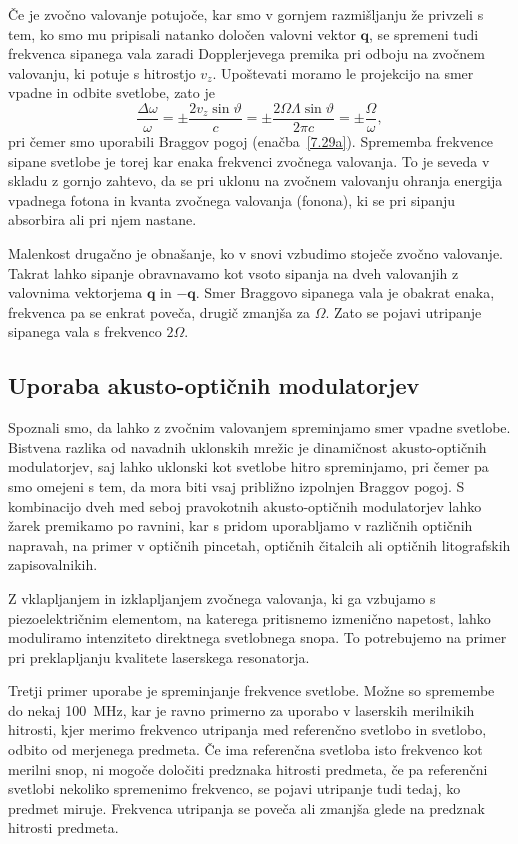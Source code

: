 Če je zvočno valovanje potujoče, kar smo v gornjem razmišljanju že privzeli
s tem, ko smo mu pripisali natanko določen valovni vektor $\mathbf{q}$,
se spremeni tudi frekvenca sipanega vala zaradi Dopplerjevega premika
pri odboju na zvočnem valovanju, ki potuje s hitrostjo $v_{z}$. Upoštevati
moramo le projekcijo na smer vpadne in odbite svetlobe, zato je 
\begin{equation}
\frac{\Delta\omega}{\omega}=\pm\frac{2v_{z}\sin\vartheta}{c}=
\pm\frac{2\Omega\Lambda\sin\vartheta}{2 \pi c}=\pm\frac{\Omega}{\omega},
\label{7.32}
\end{equation}
pri čemer smo uporabili Braggov pogoj (enačba~\ref{7.29a}). Sprememba frekvence
sipane svetlobe je torej kar enaka frekvenci zvočnega valovanja. To je seveda v skladu 
z gornjo zahtevo, da se pri uklonu na zvočnem valovanju ohranja energija
vpadnega fotona in kvanta zvočnega valovanja (fonona), ki se pri sipanju 
absorbira ali pri njem nastane.

Malenkost drugačno je obnašanje, ko v snovi vzbudimo stoječe zvočno valovanje. 
Takrat lahko sipanje obravnavamo kot vsoto sipanja na dveh valovanjih z valovnima 
vektorjema $\mathbf{q}$ in $-\mathbf{q}$. Smer Braggovo sipanega vala je obakrat enaka, 
frekvenca pa se enkrat poveča, drugič zmanjša za $\Omega$. Zato se pojavi utripanje
sipanega vala s frekvenco $2\Omega$.

\subsection*{Uporaba akusto-optičnih modulatorjev}
Spoznali smo, da lahko z zvočnim valovanjem spreminjamo smer vpadne svetlobe.
Bistvena razlika od navadnih uklonskih mrežic je dinamičnost akusto-optičnih modulatorjev, 
saj lahko uklonski kot svetlobe hitro spreminjamo, pri čemer pa smo omejeni s 
tem, da mora biti vsaj približno izpolnjen Braggov pogoj. S kombinacijo dveh med seboj 
pravokotnih akusto-optičnih modulatorjev lahko žarek 
premikamo po ravnini, kar s pridom uporabljamo v različnih optičnih napravah, 
na primer v optičnih pincetah, optičnih čitalcih ali 
optičnih litografskih zapisovalnikih.

Z vklapljanjem in izklapljanjem zvočnega valovanja, ki ga vzbujamo s piezoelektričnim elementom,
na katerega pritisnemo izmenično napetost, lahko moduliramo intenziteto
direktnega svetlobnega snopa. To potrebujemo na primer pri preklapljanju
kvalitete laserskega resonatorja.

Tretji primer uporabe je spreminjanje frekvence svetlobe. Možne so spremembe
do nekaj 100~MHz, kar je ravno primerno za uporabo v laserskih merilnikih
hitrosti, kjer merimo frekvenco utripanja med referenčno svetlobo in svetlobo, odbito od
merjenega predmeta. Če ima referenčna svetloba
isto frekvenco kot merilni snop, ni mogoče določiti predznaka hitrosti
predmeta, če pa referenčni svetlobi nekoliko spremenimo frekvenco,
se pojavi utripanje tudi tedaj, ko predmet miruje. Frekvenca utripanja
se poveča ali zmanjša glede na predznak hitrosti predmeta.


